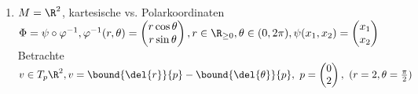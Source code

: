 \begin{exmp}
	\begin{enumerate}[label={\roman*})]
		\item $ M = \R^2 $, kartesische vs. Polarkoordinaten\\
			$ \Phi = \psi \circ \varphi^{-1}, \varphi^{-1}(r,\theta) = \begin{pmatrix}
				r \cos \theta \\ r \sin \theta
			\end{pmatrix}, r \in \R_{\geq 0}, \theta \in (0,2\pi), \psi(x_1,x_2) = \begin{pmatrix}
			x_1\\x_2
			\end{pmatrix} $\\
			Betrachte $v \in T_p\R^2, v = \bound{\del{r}}{p} - \bound{\del{\theta}}{p},\ p = \begin{pmatrix}
				0\\2
			\end{pmatrix},\ (r=2,\theta = \frac{\pi}{2})$\\
			\begin{minipage}{\linewidth}
				\begin{wrapfigure}{R}{4cm}
					\centering
				\end{wrapfigure}
				

\end{minipage}
\end{enumerate}
\end{exmp}
